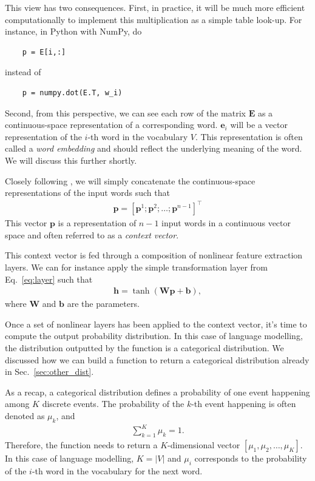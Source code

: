 \documentclass{report}
\newcommand{\vect}[1]{\mathbf{#1}}
\newcommand{\matr}[1]{\mathbf{#1}}
\newcommand{\vb}[0]{\vect{b}}
\newcommand{\ve}[0]{\vect{e}}
\newcommand{\vh}[0]{\vect{h}}
\newcommand{\vp}[0]{\vect{p}}
\newcommand{\mW}[0]{\matr{W}}
\newcommand{\mE}[0]{\matr{E}}
\begin{document}
This view has two consequences. First, in practice, it will be much more
efficient computationally to implement this multiplication as a simple table
look-up. For instance, in Python with NumPy, do
\begin{verbatim}
    p = E[i,:]
\end{verbatim}
instead of
\begin{verbatim}
    p = numpy.dot(E.T, w_i)
\end{verbatim}

Second, from this perspective, we can see each row of the matrix $\mE$ as a
continuous-space representation of a corresponding word. $\ve_i$ will be a
vector representation of the $i$-th word in the vocabulary $V$. This
representation is often called a {\it word embedding} and should reflect the
underlying meaning of the word. We will discuss this further shortly.

Closely following \cite{bengio2006neural}, we will simply concatenate the
continuous-space representations of the input words such that
\begin{align*}
    \vp = \left[ \vp^1; \vp^2; \ldots; \vp^{n-1}\right]^\top
\end{align*}
This vector $\vp$ is a representation of $n-1$ input words in a continuous
vector space and often referred to as a {\em context vector}.

This context vector is fed through a composition of nonlinear feature extraction
layers. We can for instance apply the simple transformation layer from
Eq.~\eqref{eq:layer} such that
\begin{align}
    \label{eq:nlm_context}
    \vh = \tanh(\mW \vp + \vb),
\end{align}
where $\mW$ and $\vb$ are the parameters. 

Once a set of nonlinear layers has been applied to the context vector, it's time
to compute the output probability distribution. In this case of language
modelling, the distribution outputted by the function is a categorical
distribution. We discussed how we can build a function to return a categorical
distribution already in Sec.~\ref{sec:other_dist}. 

As a recap, a categorical distribution defines a probability of one event
happening among $K$ discrete events. The probability of the $k$-th event
happening is often denoted as $\mu_k$, and
\begin{align*}
    \sum_{k=1}^K \mu_k = 1.
\end{align*}
Therefore, the function needs to return a $K$-dimensional vector $[\mu_1,\mu_2,
\ldots, \mu_K ]$. In this case of language modelling, $K=|V|$ and $\mu_i$
corresponds to the probability of the $i$-th word in the vocabulary for the next
word.
\end{document}
